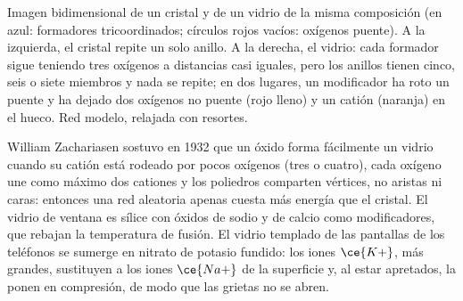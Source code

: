 \begin{omfigure}

{\small Imagen bidimensional de un cristal y de un vidrio de la misma
composición (en azul: formadores tricoordinados; círculos rojos vacíos: oxígenos
puente). A la izquierda, el cristal repite un solo anillo. A la derecha, el vidrio: cada formador
sigue teniendo tres oxígenos a distancias casi iguales, pero los anillos tienen cinco,
seis o siete miembros y nada se repite; en dos lugares, un modificador ha roto un
puente y ha dejado dos oxígenos no puente (rojo lleno) y un catión (naranja) en
el hueco. Red modelo, relajada con resortes.}
\end{omfigure}

William Zachariasen sostuvo en 1932 que un óxido forma fácilmente un vidrio cuando su
catión está rodeado por pocos oxígenos (tres o cuatro), cada oxígeno une como máximo
dos cationes y los poliedros comparten vértices, no aristas ni caras: entonces una
red aleatoria apenas cuesta más energía que el cristal. El vidrio de ventana es
sílice con óxidos de sodio y de calcio como modificadores, que rebajan la temperatura de
fusión. El vidrio templado de las pantallas de los teléfonos se sumerge en nitrato de potasio
fundido: los iones $\ce{K+}$, más grandes, sustituyen a los iones $\ce{Na+}$ de la superficie y, al estar apretados,
la ponen en compresión, de modo que las grietas no se abren.

